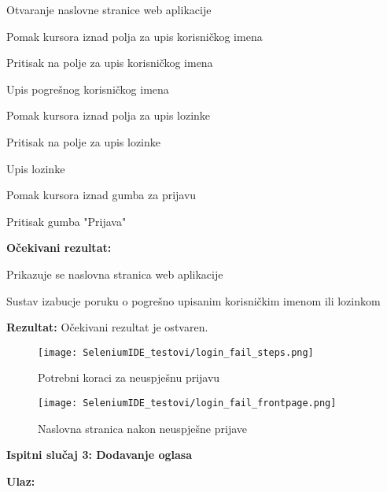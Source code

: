 					\begin{packed_enum}
					
						\item Otvaranje naslovne stranice web aplikacije
						\item Pomak kursora iznad polja za upis korisničkog imena
						\item Pritisak na polje za upis korisničkog imena
						\item Upis pogrešnog korisničkog imena
						\item Pomak kursora iznad polja za upis lozinke
						\item Pritisak na polje za upis lozinke
						\item Upis lozinke
						\item Pomak kursora iznad gumba za prijavu
						\item Pritisak gumba "Prijava"
						
					\end{packed_enum}
				
				\noindent\textbf{Očekivani rezultat:}
				
					\begin{packed_enum}
					
						\item Prikazuje se naslovna stranica web aplikacije
						\item Sustav izabucje poruku o pogrešno upisanim korisničkim imenom ili lozinkom
						
					\end{packed_enum}
				
				\noindent\textbf{Rezultat:} Očekivani rezultat je ostvaren. 
				
				\begin{figure}[H]
					\texttt{[image: SeleniumIDE\_testovi/login\_fail\_steps.png]}
					\centering
					\caption{Potrebni koraci za neuspješnu prijavu}
					\label{fig:login_steps}
				\end{figure}
				
				\begin{figure}[H]
					\texttt{[image: SeleniumIDE\_testovi/login\_fail\_frontpage.png]}
					\centering
					\caption{Naslovna stranica nakon neuspješne prijave}
					\label{fig:login_home_page}
				\end{figure}
				
\noindent\textbf{Ispitni slučaj 3: Dodavanje oglasa}
				
					\noindent\textbf{Ulaz:}
				
